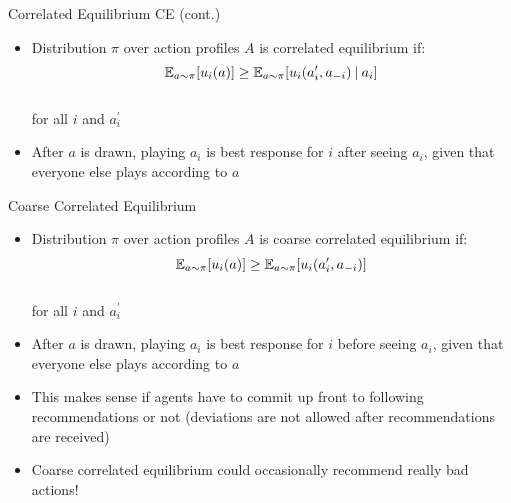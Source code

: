 \documentclass[11pt,aspectratio=169]{beamer}
\begin{document}
  
  \begin{frame}{Correlated Equilibrium  CE (cont.)}
   \begin{itemize}[<+->]
   \setlength{\itemsep}{1.5em}
    \item Distribution $\pi$ over action profiles $A$ is correlated equilibrium if:
    $$\operatorname{\mathbb{E}}_{a \sim \pi}[u_i(a)] \geq \operatorname{\mathbb{E}}_{a \sim \pi}[u_i(a_i^\prime, a_{-i}) \:\vert\: a_i]$$\\
    for all $i$ and $a_i^\prime$
    \item After $a$ is drawn, playing $a_i$ is best response for $i$ \alert{after} seeing $a_i$, given that everyone else plays according to $a$
   \end{itemize}
  \end{frame}
  
  
  \begin{frame}{Coarse Correlated Equilibrium}
   \begin{itemize}[<+->]
   \setlength{\itemsep}{1em}
    \item Distribution $\pi$ over action profiles $A$ is coarse correlated equilibrium if:
    $$\operatorname{\mathbb{E}}_{a \sim \pi}[u_i(a)] \geq \operatorname{\mathbb{E}}_{a \sim \pi}[u_i(a_i^\prime, a_{-i})]$$\\
    for all $i$ and $a_i^\prime$
    \item After $a$ is drawn, playing $a_i$ is best response for $i$ \alert{before} seeing $a_i$, given that everyone else plays according to $a$
    \item This makes sense if agents have to commit \alert{up front} to following recommendations or not (deviations are not allowed after recommendations are received)
    \item Coarse correlated equilibrium could occasionally recommend really bad actions!
   \end{itemize}
  \end{frame}
  
\end{document}
